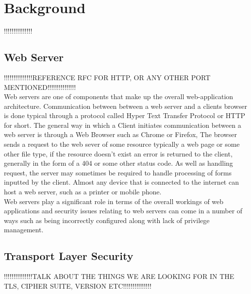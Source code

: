 \documentclass[a4wide,leqno,12pt]{report}
\begin{document}
\chapter{Background}
!!!!!!!!!!!!!!! 
\section{Web Server}
!!!!!!!!!!!!!!!REFERENCE RFC FOR HTTP, OR ANY OTHER PORT MENTIONED!!!!!!!!!!!!!!!\\




Web servers are one of components that make up the overall web-application architecture. 
Communication between between a web server and a clients browser is done typical through a protocol called Hyper Text Transfer Protocol or HTTP for short. The general way in which a Client initiates communication between a web server is through a Web Browser such as Chrome or Firefox, The browser sends a request to the web sever of some resource typically a web page or some other file type, if the resource doesn't exist an error is returned to the client, generally in the form of a 404 or some other status code. As well as handling request, the server may sometimes be required to handle processing of forms inputted by the client\cite{conallen1999modeling}. Almost any device that is connected to the internet can host a web server, such as a printer or mobile phone. \\

Web servers play a significant role in terms of the overall workings of web applications and security issues relating to web servers can come in a number of ways such as being incorrectly configured\cite{mendes2008assessing} along with lack of privilege management.
\section{Transport Layer Security}
!!!!!!!!!!!!!!!TALK ABOUT THE THINGS WE ARE LOOKING FOR IN THE TLS, CIPHER SUITE, VERSION ETC!!!!!!!!!!!!!!!\\
\end{document}
